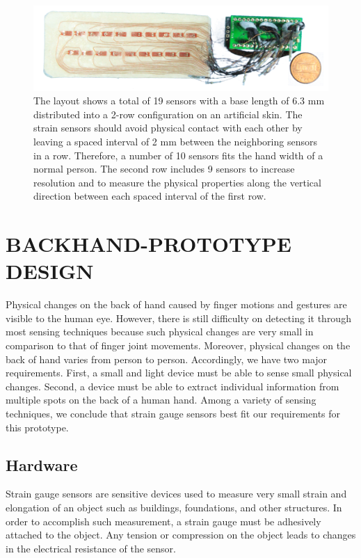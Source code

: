 \documentclass{sigchi}
\begin{document}
\begin{figure}[b]
 \begin{center}
  \includegraphics[width=1\columnwidth]{figures/prototypeV2.jpg}
  \caption{The layout shows a total of 19 sensors with a base length of 6.3 mm distributed into a 2-row configuration on an artificial skin. The strain sensors should avoid physical contact with each other by leaving a spaced interval of 2 mm between the neighboring sensors in a row. Therefore, a number of 10 sensors fits the hand width of a normal person. The second row includes 9 sensors to increase resolution and to measure the physical properties along the vertical direction between each spaced interval of the first row.}
  \label{fig:tie}
  \end{center}
\end{figure}

\section{BACKHAND-PROTOTYPE DESIGN}

Physical changes on the back of hand caused by finger motions and gestures are visible to the human eye. However, there is still difficulty on detecting it through most sensing techniques because such physical changes are very small in comparison to that of finger joint movements. Moreover, physical changes on the back of hand varies from person to person. Accordingly, we have two major requirements. First, a small and light device must be able to sense small physical changes. Second, a device must be able to extract individual information from multiple spots on the back of a human hand. Among a variety of sensing techniques, we conclude that strain gauge sensors best fit our requirements for this prototype.
 
\subsection{Hardware} 

Strain gauge sensors are sensitive devices used to measure very small strain and elongation of an object such as buildings, foundations, and other structures. In order to accomplish such measurement, a strain gauge must be adhesively attached to the object. Any tension or compression on the object leads to changes in the electrical resistance of the sensor.
\end{document}

